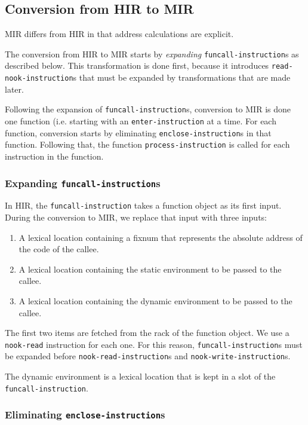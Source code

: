 \subsection{Conversion from HIR to MIR}

MIR differs from HIR in that address calculations are explicit.

The conversion from HIR to MIR starts by \emph{expanding}
\texttt{funcall-instruction}s as described below.  This transformation
is done first, because it introduces \texttt{read-nook-instruction}s
that must be expanded by transformations that are made later.

Following the expansion of \texttt{funcall-instruction}s, conversion
to MIR is done one function (i.e. starting with an
\texttt{enter-instruction} at a time.  For each function, conversion
starts by eliminating \texttt{enclose-instruction}s in that function.
Following that, the function \texttt{process-instruction} is called
for each instruction in the function.

\subsubsection{Expanding \texttt{funcall-instruction}s}

In HIR, the \texttt{funcall-instruction} takes a function object as
its first input.  During the conversion to MIR, we replace that input
with three inputs:

\begin{enumerate}
\item A lexical location containing a fixnum that represents the
  absolute address of the code of the callee.
\item A lexical location containing the static environment to be
  passed to the callee.
\item A lexical location containing the dynamic environment to be
  passed to the callee.
\end{enumerate}

The first two items are fetched from the rack of the function object.
We use a \texttt{nook-read} instruction for each one.  For this
reason, \texttt{funcall-instruction}s must be expanded before
\texttt{nook-read-instruction}s and \texttt{nook-write-instruction}s.

The dynamic environment is a lexical location that is kept in a slot
of the \texttt{funcall-instruction}.

\subsubsection{Eliminating \texttt{enclose-instruction}s}

